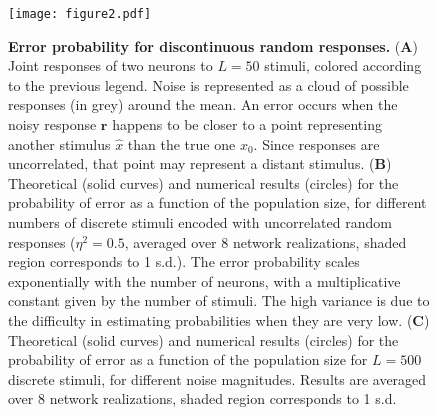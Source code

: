 \documentclass[a4paper]{article}%
\begin{document}
\begin{figure}[ptb]
\centering
\texttt{[image: figure2.pdf]}\caption{\textbf{Error
probability for discontinuous random responses.} (\textbf{A}) Joint responses
of two neurons to $L=50$ stimuli, colored according to the previous
legend. Noise is represented as a cloud of possible responses (in grey) around
the mean. An error occurs when the noisy response $\mathbf{r}$ happens to
be closer to a point representing another stimulus $\hat{x}$ than the true one
$x_{0}$. Since responses are uncorrelated, that point may represent a distant
stimulus. (\textbf{B}) Theoretical (solid curves) and numerical results (circles)
for the probability of error as a function of the population size, for different
numbers of discrete stimuli encoded with uncorrelated random responses
($\eta^{2}=0.5$, averaged over 8 network realizations, shaded region
corresponds to 1 s.d.). The error probability scales exponentially with the
number of neurons, with a multiplicative constant given by the number of
stimuli. The high variance is due to the difficulty in estimating
probabilities when they are very low. (\textbf{C}) Theoretical (solid curves)
and numerical results (circles) for the probability of error as a function of the
population size for $L=500$ discrete stimuli, for different noise magnitudes. Results are
averaged over 8 network realizations, shaded region corresponds to 1 s.d.}
\label{Fig:2}
\end{figure}

\clearpage
\end{document}

